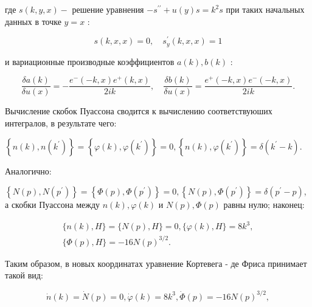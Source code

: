 \documentclass[10pt]{article}
\begin{document}
где $s(k, y, x)-$ решение уравнения $-s^{\prime \prime}+u(y) s=k^{2} s$ при таких начальных данных в точке $y=x$ :



\[

s(k, x, x)=0, \quad s_{y}^{\prime}(k, x, x)=1

\]



и вариационные производные коэффициентов $a(k), b(k)$ :



\[

\frac{\delta a(k)}{\delta u(x)}=-\frac{e^{-}(-k, x) e^{+}(k, x)}{2 i k}, \quad \frac{\delta b(k)}{\delta u(x)}=\frac{e^{+}(-k, x) e^{-}(-k, x)}{2 i k} .

\]



Вычисление скобок Пуассона сводится к вычислению соответствуюших интегралов, в результате чего:



$\left\{n(k), n\left(k^{\prime}\right)\right\}=\left\{\varphi(k), \varphi\left(k^{\prime}\right)\right\}=0,\left\{n(k), \varphi\left(k^{\prime}\right)\right\}=\delta\left(k^{\prime}-k\right)$.



Аналогично:



$\left\{N(p), N\left(p^{\prime}\right)\right\}=\left\{\Phi(p), \Phi\left(p^{\prime}\right)\right\}=0,\left\{N(p), \Phi\left(p^{\prime}\right)\right\}=\delta\left(p^{\prime}-p\right)$, а скобки Пуассона между $n(k), \varphi(k)$ и $N(p), \Phi(p)$ равны нулю; наконец:



\[

\begin{gathered}

\{n(k), H\}=\{N(p), H\}=0,\{\varphi(k), H\}=8 k^{3}, \\

\{\Phi(p), H\}=-16 N(p)^{3 / 2} .

\end{gathered}

\]



Таким образом, в новых координатах уравнение Кортевега - де Фриса принимает такой вид:



\[

\dot{n}(k)=\dot{N}(p)=0, \dot{\varphi}(k)=8 k^{3}, \dot{\Phi}(p)=-16 N(p)^{3 / 2},

\]
\end{document}
